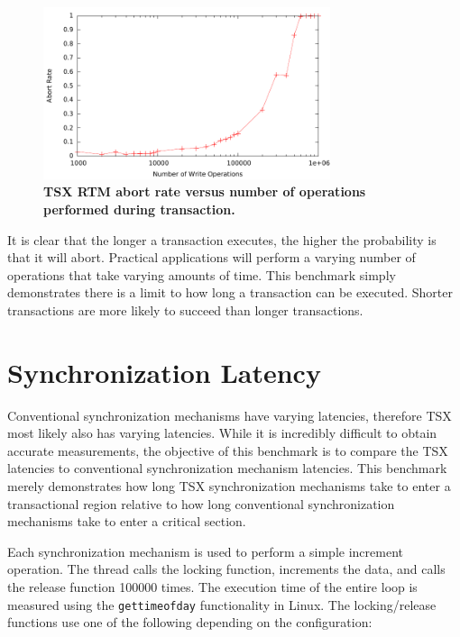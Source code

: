 \documentclass[11pt]{book}
\begin{document}
\begin{figure}[H]
    \centering
    \graphicspath{ {./figures/} }
    \includegraphics[width=0.75\textwidth,keepaspectratio]{trxDuration}
    \caption{\textbf{TSX RTM abort rate versus number of operations performed during
        transaction.}}\label{fig:trx_duration}
\end{figure}

It is clear that the longer a transaction executes, the higher the probability is that it
will abort.  Practical applications will perform a varying number of operations that take
varying amounts of time.  This benchmark simply demonstrates there is a limit to how long
a transaction can be executed.  Shorter transactions are more likely to succeed than
longer transactions.

\section{Synchronization Latency}

Conventional synchronization mechanisms have varying latencies, therefore TSX most likely
also has varying latencies.  While it is incredibly difficult to obtain accurate
measurements, the objective of this benchmark is to compare the TSX latencies to
conventional synchronization mechanism latencies.  This benchmark merely demonstrates how
long TSX synchronization mechanisms take to enter a transactional region relative to how
long conventional synchronization mechanisms take to enter a critical section.

Each synchronization mechanism is used to perform a simple increment operation.  The
thread calls the locking function, increments the data, and calls the release function
100000 times.  The execution time of the entire loop is measured using the
\texttt{gettimeofday} functionality in Linux.  The locking/release functions use one of
the following depending on the configuration:
\end{document}
